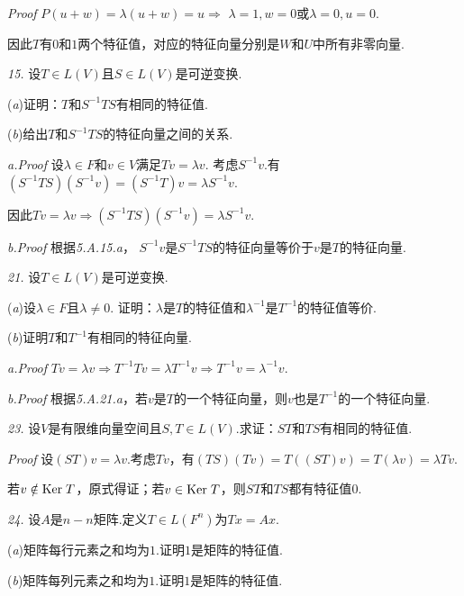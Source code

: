 \textit{Proof}
\(P(u+w)=\lambda(u+w)=u \Rightarrow\) \(\lambda=1,w=0\)或\(\lambda=0,u=0\).

因此\(T\)有\(0\)和\(1\)两个特征值，对应的特征向量分别是\(W\)和\(U\)中所有非零向量.

\hspace*{\fill}

\textit{15.}
设\(T \in L(V)\)且\(S \in L(V)\)是可逆变换.

(\textit{a})证明：\(T\)和\(S^{-1}TS\)有相同的特征值.

(\textit{b})给出\(T\)和\(S^{-1}TS\)的特征向量之间的关系.

\textit{a.Proof}
设\(\lambda \in F\)和\(v \in V\)满足\(Tv=\lambda v\).
考虑\(S^{-1}v\).有\((S^{-1}TS)(S^{-1}v)=(S^{-1}T)v=\lambda S^{-1}v\).

因此\(Tv=\lambda v \Rightarrow (S^{-1}TS)(S^{-1}v)=\lambda S^{-1}v\).

\textit{b.Proof}
根据\textit{5.A.15.a}，
\(S^{-1}v\)是\(S^{-1}TS\)的特征向量等价于\(v\)是\(T\)的特征向量.

\hspace*{\fill}

\textit{21.}
设\(T \in L(V)\)是可逆变换.

(\textit{a})设\(\lambda \in F\)且\(\lambda \ne 0\).
证明：\(\lambda\)是\(T\)的特征值和\(\lambda^{-1}\)是\(T^{-1}\)的特征值等价.

(\textit{b})证明\(T\)和\(T^{-1}\)有相同的特征向量.

\textit{a.Proof}
\(Tv=\lambda v \Rightarrow T^{-1}Tv=\lambda T^{-1}v \Rightarrow T^{-1}v=\lambda^{-1} v\).

\textit{b.Proof}
根据\textit{5.A.21.a}，若\(v\)是\(T\)的一个特征向量，则\(v\)也是\(T^{-1}\)的一个特征向量.

\newpage

\textit{23.}
设\(V\)是有限维向量空间且\(S,T \in L(V)\).求证：\(ST\)和\(TS\)有相同的特征值.

\textit{Proof}
设\((ST)v=\lambda v\).考虑\(Tv\)，有\((TS)(Tv)=T((ST)v)=T(\lambda v)=\lambda Tv\).

若\(v \notin \mathrm{Ker \;} T\)，原式得证；若\(v \in \mathrm{Ker \;} T\)，则\(ST\)和\(TS\)都有特征值\(0\).

\hspace*{\fill}

\textit{24.}
设\(A\)是\(n-n\)矩阵.定义\(T \in L(F^n)\)为\(Tx=Ax\).

(\textit{a})矩阵每行元素之和均为\(1\).证明\(1\)是矩阵的特征值.

(\textit{b})矩阵每列元素之和均为\(1\).证明\(1\)是矩阵的特征值.


